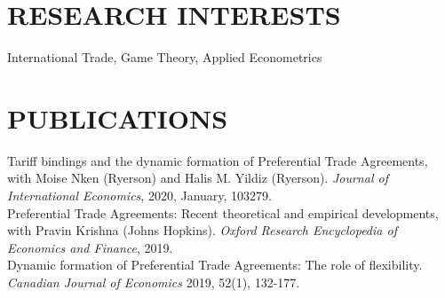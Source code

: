 \documentclass[11pt]{res}
\begin{document}
\begin{resume}
\section{RESEARCH INTERESTS}\vspace{1.5mm}
International Trade, Game Theory, Applied Econometrics

\section{PUBLICATIONS}\vspace{1.5mm}
{Tariff bindings and the dynamic formation of Preferential Trade Agreements}, with Moise Nken (Ryerson) and Halis M. Yildiz (Ryerson). \emph{Journal of International Economics}, 2020, January, 103279.\vspace{1.5mm}\\
{Preferential Trade Agreements: Recent theoretical and empirical developments}, with Pravin Krishna (Johns Hopkins). \emph{Oxford Research Encyclopedia of Economics and Finance}, 2019.\vspace{1.5mm}\\
{Dynamic formation of Preferential Trade Agreements: The role of flexibility}. \emph{Canadian Journal of Economics} 2019, 52(1), 132-177. \vspace{1.5mm}\\



\end{resume}
\end{document}
